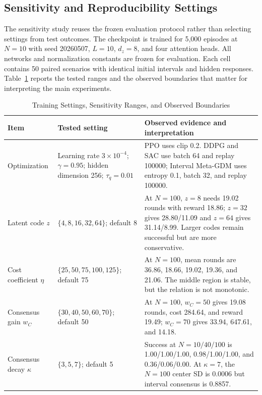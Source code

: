 \documentclass[journal]{IEEEtran}
\begin{document}
\subsection{Sensitivity and Reproducibility Settings}

The sensitivity study reuses the frozen evaluation protocol rather than selecting settings from test outcomes. The checkpoint is trained for 5,000 episodes at $N=10$ with seed 20260507, $L=10$, $d_z=8$, and four attention heads. All networks and normalization constants are frozen for evaluation. Each cell contains 50 paired scenarios with identical initial intervals and hidden responses. Table~\ref{tab:sensitivity} reports the tested ranges and the observed boundaries that matter for interpreting the main experiments.

\begin{table}[!t]
\caption{Training Settings, Sensitivity Ranges, and Observed Boundaries}
\label{tab:sensitivity}
\centering
\scriptsize
\setlength{\tabcolsep}{3pt}
\begin{tabular}{p{}p{}p{}}
\toprule
Item & Tested setting & Observed evidence and interpretation \\
\midrule
Optimization & Learning rate $3\times10^{-4}$; $\gamma=0.95$; hidden dimension 256; $\tau_q=0.01$ & PPO uses clip 0.2. DDPG and SAC use batch 64 and replay 100000; Interval Meta-GDM uses entropy 0.1, batch 32, and replay 100000. \\
Latent code $z$ & $\{4,8,16,32,64\}$; default 8 & At $N=100$, $z=8$ needs 19.02 rounds with reward 18.86; $z=32$ gives 28.80/11.09 and $z=64$ gives 31.14/8.99. Larger codes remain successful but are more conservative. \\
Cost coefficient $\eta$ & $\{25,50,75,100,125\}$; default 75 & At $N=100$, mean rounds are 36.86, 18.66, 19.02, 19.36, and 21.06. The middle region is stable, but the relation is not monotonic. \\
Consensus gain $w_C$ & $\{30,40,50,60,70\}$; default 50 & At $N=100$, $w_C=50$ gives 19.08 rounds, cost 284.64, and reward 19.49; $w_C=70$ gives 33.94, 647.61, and 14.18. \\
Consensus decay $\kappa$ & $\{3,5,7\}$; default 5 & Success at $N=10/40/100$ is 1.00/1.00/1.00, 0.98/1.00/1.00, and 0.36/0.06/0.00. At $\kappa=7$, the $N=100$ center SD is 0.0006 but interval consensus is 0.8857. \\
\bottomrule
\end{tabular}
\end{table}
\end{document}

